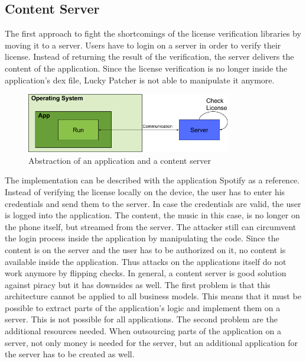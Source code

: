 \subsection{Content Server} \label{section:counter-replace-server}
The first approach to fight the shortcomings of the license verification libraries by moving it to a server.
Users have to login on a server in order to verify their license.
Instead of returning the result of the verification, the server delivers the content of the application.
Since the license verification is no longer inside the application's \gls{dex} file, Lucky Patcher is not able to manipulate it anymore.
\newline
\begin{figure}[h]
    \centering
    \includegraphics[width=0.8\textwidth]{data/contentServer.png}
    \caption{Abstraction of an application and a content server}
    \label{fig:contentServer}
\end{figure}
The implementation can be described with the application Spotify \cite{spotify} as a reference.
Instead of verifying the license locally on the device, the user has to enter his credentials and send them to the server.
In case the credentials are valid, the user is logged into the application.
The content, the music in this case, is no longer on the phone itself, but streamed from the server.
The attacker still can circumvent the login process inside the application by manipulating the code.
Since the content is on the server and the user has to be authorized on it, no content is available inside the application.
Thus attacks on the applications itself do not work anymore by flipping checks.
\newline
\newline
In general, a content server is good solution against piracy but it has downsides as well.
The first problem is that this architecture cannot be applied to all business models.
This means that it must be possible to extract parts of the application's logic and implement them on a server.
This is not possible for all applications.
\newline
The second problem are the additional resources needed.
When outsourcing parts of the application on a server, not only money is needed for the server, but an additional application for the server has to be created as well.
